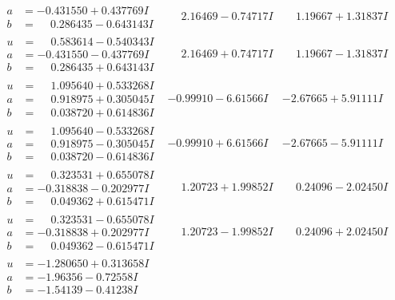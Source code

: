 \documentclass[1p]{elsarticle_modified}
\theoremstyle{definition}
\begin{document}
$$\begin{array}{c|c|c}
\begin{aligned}
a &= -0.431550 + 0.437769 I \\
b &= \phantom{-}0.286435 - 0.643143 I\end{aligned}
 & \phantom{-}2.16469 - 0.74717 I & \phantom{-}1.19667 + 1.31837 I \\ \hline\begin{aligned}
u &= \phantom{-}0.583614 - 0.540343 I \\
a &= -0.431550 - 0.437769 I \\
b &= \phantom{-}0.286435 + 0.643143 I\end{aligned}
 & \phantom{-}2.16469 + 0.74717 I & \phantom{-}1.19667 - 1.31837 I \\ \hline\begin{aligned}
u &= \phantom{-}1.095640 + 0.533268 I \\
a &= \phantom{-}0.918975 + 0.305045 I \\
b &= \phantom{-}0.038720 + 0.614836 I\end{aligned}
 & -0.99910 - 6.61566 I & -2.67665 + 5.91111 I \\ \hline\begin{aligned}
u &= \phantom{-}1.095640 - 0.533268 I \\
a &= \phantom{-}0.918975 - 0.305045 I \\
b &= \phantom{-}0.038720 - 0.614836 I\end{aligned}
 & -0.99910 + 6.61566 I & -2.67665 - 5.91111 I \\ \hline\begin{aligned}
u &= \phantom{-}0.323531 + 0.655078 I \\
a &= -0.318838 - 0.202977 I \\
b &= \phantom{-}0.049362 + 0.615471 I\end{aligned}
 & \phantom{-}1.20723 + 1.99852 I & \phantom{-}0.24096 - 2.02450 I \\ \hline\begin{aligned}
u &= \phantom{-}0.323531 - 0.655078 I \\
a &= -0.318838 + 0.202977 I \\
b &= \phantom{-}0.049362 - 0.615471 I\end{aligned}
 & \phantom{-}1.20723 - 1.99852 I & \phantom{-}0.24096 + 2.02450 I \\ \hline\begin{aligned}
u &= -1.280650 + 0.313658 I \\
a &= -1.96356 - 0.72558 I \\
b &= -1.54139 - 0.41238 I\end{aligned}

\end{array}$$
\end{document}
